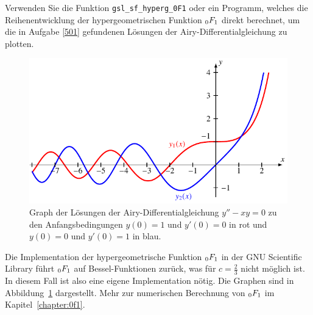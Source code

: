Verwenden Sie die Funktion \verb+gsl_sf_hyperg_0F1+ oder ein Programm,
welches die Reihenentwicklung der hypergeometrischen Funktion
$\mathstrut_0F_1$ direkt berechnet, um die
in Aufgabe \ref{501} gefundenen Lösungen der Airy-Differentialgleichung
zu plotten.
%

\begin{figure}
\centering
\includegraphics{chapters/050-differential/uebungsaufgaben/airy.pdf}
\caption{Graph der Lösungen der Airy-Differentialgleichung $y''-xy=0$
zu den Anfangsbedingungen $y(0)=1$ und $y'(0)=0$ in {\color{red}rot}
und $y(0)=0$ und $y'(0)=1$ in {\color{blue}blau}.
\label{buch:differentialgleichunge:uebung:503:plot}}
\end{figure}
\begin{loesung}
Die Implementation der hypergeometrische Funktion $\mathstrut_0F_1$ in der
GNU Scientific Library führt $\mathstrut_0F_1$ auf Bessel-Funktionen
%
%
zurück, was für $c=\frac23$ nicht möglich ist. 
In diesem Fall ist also eine eigene Implementation nötig.
Die Graphen sind in Abbildung~\ref{buch:differentialgleichunge:uebung:503:plot}
dargestellt.
Mehr zur numerischen Berechnung von $\mathstrut_0F_1$ im
Kapitel~\ref{chapter:0f1}.
\end{loesung}
